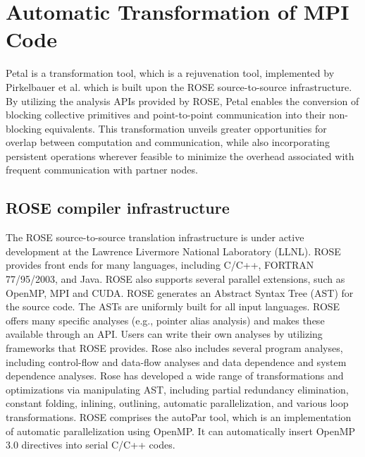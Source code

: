 \section{Automatic Transformation of MPI Code}

Petal is a transformation tool, which is a rejuvenation tool, implemented by Pirkelbauer et al. \cite{pirkelbauer_source_2010} which is built upon the ROSE source-to-source infrastructure. 
By utilizing the analysis APIs provided by ROSE, Petal enables the conversion of blocking collective primitives and point-to-point communication into their non-blocking equivalents. 
This transformation unveils greater opportunities for overlap between computation and communication, while also incorporating persistent operations wherever feasible to minimize the overhead associated with frequent communication with partner nodes.\\

\subsection{ROSE compiler infrastructure}
The ROSE \cite{quinlan_rose_2023} source-to-source translation infrastructure is under active development at the Lawrence Livermore National Laboratory (LLNL). ROSE provides front ends for many languages, including C/C++, FORTRAN 77/95/2003, and Java. ROSE also supports several parallel extensions, such as OpenMP, MPI and CUDA. ROSE generates an Abstract Syntax Tree (AST) for the source code. The ASTs are uniformly built for all input languages. ROSE offers many specific analyses (e.g., pointer alias analysis) and makes these available through an API. Users can write their own analyses by utilizing frameworks that ROSE provides. Rose also includes several program analyses, including control-flow and data-flow analyses and data dependence and system dependence analyses. Rose has developed a wide range of transformations and optimizations via manipulating AST, including partial redundancy elimination, constant folding, inlining, outlining, automatic parallelization, and various loop transformations. ROSE comprises the autoPar tool, which is an implementation of automatic parallelization using OpenMP. It can automatically insert OpenMP 3.0 directives into serial C/C++ codes.

